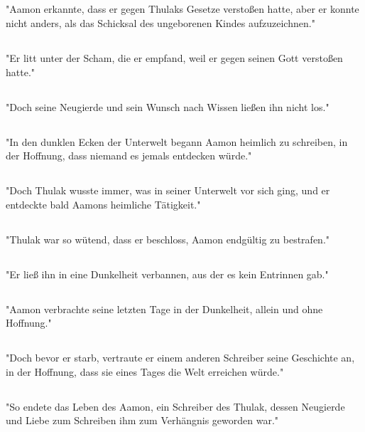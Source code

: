 \documentclass{article}
\begin{document}
\subsection{}
"Aamon erkannte, dass er gegen Thulaks Gesetze verstoßen hatte, aber er konnte nicht anders, als das Schicksal des ungeborenen Kindes aufzuzeichnen."
\subsection{}
"Er litt unter der Scham, die er empfand, weil er gegen seinen Gott verstoßen hatte."
\subsection{}
"Doch seine Neugierde und sein Wunsch nach Wissen ließen ihn nicht los."
\subsection{}
"In den dunklen Ecken der Unterwelt begann Aamon heimlich zu schreiben, in der Hoffnung, dass niemand es jemals entdecken würde."
\subsection{}
"Doch Thulak wusste immer, was in seiner Unterwelt vor sich ging, und er entdeckte bald Aamons heimliche Tätigkeit."
\subsection{}
"Thulak war so wütend, dass er beschloss, Aamon endgültig zu bestrafen."
\subsection{}
"Er ließ ihn in eine Dunkelheit verbannen, aus der es kein Entrinnen gab."
\subsection{}
"Aamon verbrachte seine letzten Tage in der Dunkelheit, allein und ohne Hoffnung."
\subsection{}
"Doch bevor er starb, vertraute er einem anderen Schreiber seine Geschichte an, in der Hoffnung, dass sie eines Tages die Welt erreichen würde."
\subsection{}
"So endete das Leben des Aamon, ein Schreiber des Thulak, dessen Neugierde und Liebe zum Schreiben ihm zum Verhängnis geworden war."
\end{document}
